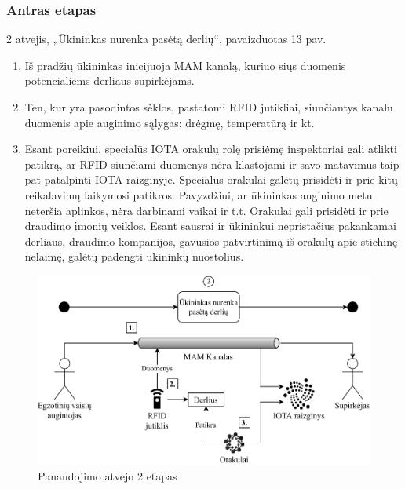 \subsubsection{Antras etapas}

2 atvejis, „Ūkininkas nurenka pasėtą derlių“, pavaizduotas 13 pav.
\begin{enumerate}
    \item Iš pradžių ūkininkas inicijuoja MAM kanalą, kuriuo siųs duomenis potencialiems derliaus supirkėjams.
    \item Ten, kur yra pasodintos sėklos, pastatomi RFID jutikliai, siunčiantys kanalu duomenis apie auginimo sąlygas: drėgmę, temperatūrą ir kt.
    \item Esant poreikiui, specialūs IOTA orakulų rolę prisiėmę inspektoriai gali atlikti patikrą, ar RFID siunčiami duomenys nėra klastojami ir savo matavimus taip pat patalpinti IOTA raizginyje. Specialūs orakulai galėtų prisidėti ir prie kitų reikalavimų laikymosi patikros. Pavyzdžiui, ar ūkininkas auginimo metu neteršia aplinkos, nėra darbinami vaikai ir t.t. Orakulai gali prisidėti ir prie draudimo įmonių veiklos. Esant sausrai ir ūkininkui nepristačius pakankamai derliaus, draudimo kompanijos, gavusios patvirtinimą iš orakulų apie stichinę nelaimę, galėtų padengti ūkininkų nuostolius.
\end{enumerate}

\begin{figure}[H]
    \centering
    \includegraphics[scale=0.7]{images/iota-usecase-2}
    \caption{Panaudojimo atvejo 2 etapas}
\end{figure}




